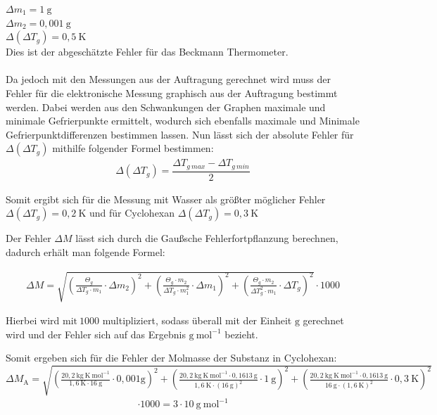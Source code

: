\documentclass[12pt,a4paper,titlepage,headinclude,bibtotoc]{scrartcl}
\begin{document}
$\Delta m_1 = 1{~}\mathrm{g}  $\\
$\Delta m_2 = 0,001{~}\mathrm{g}  $\\
$\Delta (\Delta T_g) = 0,5{~}\text{K}  $\\ Dies ist der abgeschätzte Fehler für das Beckmann Thermometer.\\\\
Da jedoch mit den Messungen aus der Auftragung gerechnet wird muss der Fehler für die elektronische Messung graphisch aus der Auftragung bestimmt werden. Dabei werden aus den Schwankungen der Graphen maximale und minimale Gefrierpunkte ermittelt, wodurch sich ebenfalls maximale und Minimale Gefrierpunktdifferenzen bestimmen lassen. Nun lässt sich der absolute Fehler für $\Delta (\Delta T_g)$ mithilfe folgender Formel bestimmen:
\begin{align}
\Delta (\Delta T_g) = \dfrac{ \Delta T_{g\mathrm{~}{max}}-\Delta T_{g\mathrm{~}{min}}}{2}
\end{align}

Somit ergibt sich für die Messung mit Wasser als größter möglicher Fehler $\Delta (\Delta T_g) = 0,2{~\mathrm{K}}$  und für Cyclohexan $\Delta (\Delta T_g) = 0,3{~\mathrm{K}}$

Der Fehler $\Delta M$ lässt sich durch die Gaußsche Fehlerfortpflanzung berechnen, dadurch erhält man folgende Formel:

\begin{align}
\Delta M = \sqrt{ \left( \frac {\Theta _g}{ \Delta T_g\cdot m_1} \cdot \Delta m_2 \right)^2 + \left( \frac {\Theta _g \cdot m_2 }{ \Delta T_g\cdot m_1^2 } \cdot \Delta m_1 \right)^2 + \left( \frac {\Theta _g \cdot m_2 }{ \Delta T_g^2 \cdot m_1} \cdot \Delta T_g \right)^2 } \cdot 1000
\end{align}

Hierbei wird $\mathrm{mit {~}1000}$ multipliziert, sodass überall mit der Einheit $\mathrm{g}$ gerechnet wird und der Fehler sich auf das Ergebnis $\mathrm{g{~} mol^{-1}}$ bezieht.

Somit ergeben sich für die Fehler der Molmasse der Substanz in Cyclohexan:\\


$\Delta M_\mathrm{A} = \sqrt{ \left( \frac {20,2 {~}\mathrm{kg {~} K {~} mol^{-1}}}{ 1,6 {~} \mathrm{K} \cdot 16 {~}\mathrm{g}} \cdot 0,001 \mathrm{g} \right)^2 + \left( \frac { 20,2 {~}\mathrm{kg{~}K {~} mol^{-1}} \cdot 0,1613{~}\mathrm{g} }{ 1,6 {~}\text{K}\cdot (16 {~}\mathrm{g} )^2 } \cdot 1 {~} \mathrm{g} \right)^2 +  \left( \frac {20,2 {~}\mathrm{kg{~}K {~} mol^{-1}} \cdot 0,1613 {~} \mathrm{g}} { 16 {~} \mathrm{g} \cdot (1,6 {~} \text{K})^2} \cdot 0,3{~} \text{K} \right)^2}  $
\begin{align}
\cdot 1000 = 3 \cdot 10{~}\mathrm{g{~}mol^{-1}}
\end{align}
\end{document}
